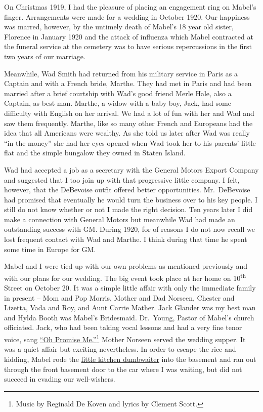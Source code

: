 \documentclass[12pt]{book}              %
\begin{document}
On Christmas 1919, I had the pleasure of placing an engagement ring on Mabel's finger. Arrangements were made for a wedding in October 1920. Our happiness was marred, however, by the untimely death of Mabel's 18 year old sister, Florence in January 1920 and the attack of influenza which Mabel contracted at the funeral service at the cemetery was to have serious repercussions in the first two years of our marriage. 

Meanwhile, Wad Smith had returned from his military service in Paris as a Captain and with a French bride, Marthe. They had met in Paris and had been married after a brief courtship with Wad's good friend Merle Hale, also a Captain, as best man. Marthe, a widow with a baby boy, Jack, had some difficulty with English on her arrival. We had a lot of fun with her and Wad and saw them frequently. Marthe, like so many other French and Europeans had the idea that all Americans were wealthy. As she told us later after Wad was really ``in the money'' she had her eyes opened when Wad took her to his parents' little flat and the simple bungalow they owned in Staten Island. 

Wad had accepted a job as a secretary with the General Motors Export Company and suggested that I too join up with that progressive little company. I felt, however, that the DeBevoise outfit offered better opportunities. Mr.~DeBevoise had promised that eventually he would turn the business over to his key people. I still do not know whether or not I made the right decision. Ten years later I did make a connection with General Motors but meanwhile Wad had made an outstanding success with GM. During 1920, for of reasons I do not now recall we lost frequent contact with Wad and Marthe. I think during that time he spent some time in Europe for GM.

Mabel and I were tied up with our own problems as mentioned previously and with our plans for our wedding. The big event took place at her home on 10\textsuperscript{th} Street on October 20. It was a simple little affair with only the immediate family in present -- Mom and Pop Morris, Mother and Dad Norseen, Chester and Lizetta, Vada and Roy, and Aunt Carrie Mather. Jack Glander was my best man and Hylda Booth was Mabel's Bridesmaid. Dr.~Young, Pastor of Mabel's church officiated. Jack, who had been taking vocal lessons and had a very fine tenor voice, sang \href{http://en.wikipedia.org/wiki/Oh_Promise_Me}{``Oh Promise Me.''}\footnote{Music by Reginald De Koven and lyrics by Clement Scott.} Mother Norseen served the wedding supper. It was a quiet affair but exciting nevertheless. In order to escape the rice and kidding, Mabel rode the \href{http://en.wikipedia.org/wiki/Dumbwaiter_(elevator)}{little kitchen dumbwaiter} into the basement and ran out through the front basement door to the car where I was waiting, but did not succeed in evading our well-wishers. 
\end{document}
